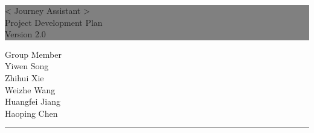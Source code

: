 \documentclass[10pt]{article}
\begin{document}

\begin{titlepage} %
	
	
	\colorbox{grey}{
		\parbox[t]{1.1\textwidth}{ %
			\parbox[t]{1.02\textwidth}{ %
				\raggedleft %
				\fontsize{34pt}{40pt}\selectfont %
				\vspace{0.7cm} %
				
				< Journey Assistant >\\
                Project Development Plan\\
                Version 2.0\\
				
				\vspace{0.7cm} %
			}
		}
	}
	
	\vfill %
	
	
	\parbox[t]{1\textwidth}{ %
		\raggedleft %
		\large %
		{\Large Group Member}\\[4pt] %
        Yiwen Song\\
        Zhihui Xie\\
        Weizhe Wang\\
        Huangfei Jiang\\
        Haoping Chen\\
		
		\hfill\rule{0.2\linewidth}{1pt}%
    }
    
	
\end{titlepage}
\end{document}
